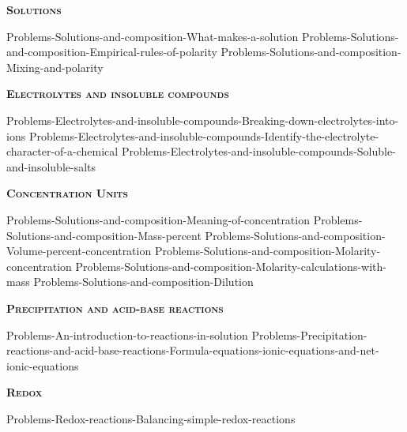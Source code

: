 \documentclass[main.tex]{subfiles}
\newcommand\chapterlabel{Ch-electrolytes}
\begin{document}
\newpage
\setdoublesep{0.35700 em}  %
\setatomsep{1.78500 em}    %
\setbondoffset{0.18265 em} %
\newcommand{\bondwidth}{0.06642 em} %
\setbondstyle{line width = \bondwidth}
\fancyhfoffset[E,O]{0pt}
\setlength{\columnsep}{30pt}
\begin{conclusion}
\end{conclusion}
\begin{multicols*}{2}\setcounter{numA}{1}


{\raggedright\textsc{\textbf{Solutions }}\par}
{Problems-Solutions-and-composition-What-makes-a-solution}
{Problems-Solutions-and-composition-Empirical-rules-of-polarity}
{Problems-Solutions-and-composition-Mixing-and-polarity}


{\raggedright\textsc{\textbf{Electrolytes and insoluble compounds}}\par}
{Problems-Electrolytes-and-insoluble-compounds-Breaking-down-electrolytes-into-ions}
{Problems-Electrolytes-and-insoluble-compounds-Identify-the-electrolyte-character-of-a-chemical}
{Problems-Electrolytes-and-insoluble-compounds-Soluble-and-insoluble-salts}


{\raggedright\textsc{\textbf{Concentration Units }}\par}
{Problems-Solutions-and-composition-Meaning-of-concentration}
{Problems-Solutions-and-composition-Mass-percent}
{Problems-Solutions-and-composition-Volume-percent-concentration}
{Problems-Solutions-and-composition-Molarity-concentration}
{Problems-Solutions-and-composition-Molarity-calculations-with-mass}
{Problems-Solutions-and-composition-Dilution}



{\raggedright\textsc{\textbf{Precipitation and acid-base reactions}}\par}
{Problems-An-introduction-to-reactions-in-solution}
{Problems-Precipitation-reactions-and-acid-base-reactions-Formula-equations-ionic-equations-and-net-ionic-equations}
{\raggedright\textsc{\textbf{Redox}}\par}
{Problems-Redox-reactions-Balancing-simple-redox-reactions}


\end{multicols*}
\end{document}
